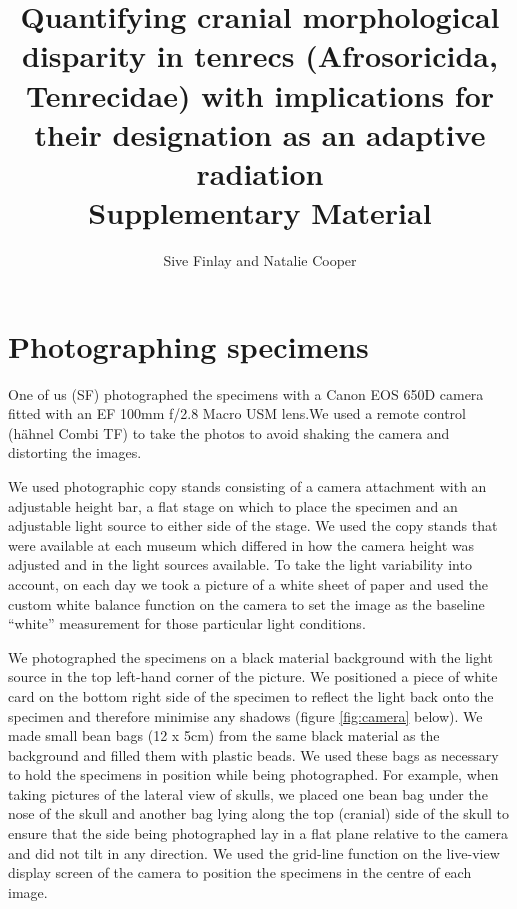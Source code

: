 \documentclass[12pt,a4paper]{article}
\begin{document}
\title{
       Quantifying cranial morphological disparity in tenrecs (Afrosoricida, Tenrecidae) with implications for their designation as an adaptive radiation\\
       \bigskip
       Supplementary Material }
\author{Sive Finlay and Natalie Cooper}
\date{}
\maketitle





\section{Photographing specimens}
One of us (SF) photographed the specimens with a Canon EOS 650D camera fitted with an EF 100mm f/2.8 Macro USM lens.We used a remote control (h\"ahnel Combi TF) to take the photos to avoid shaking the camera and distorting the images.

We used photographic copy stands consisting of a camera attachment with an adjustable height bar, a flat stage on which to place the specimen and an adjustable light source to either side of the stage. We used the copy stands that were available at each museum which differed in how the camera height was adjusted and in the light sources available.
To take the light variability into account, on each day we took a picture of a white sheet of paper and used the custom white balance function on the camera to set the image as the baseline “white” measurement for those particular light conditions.

We photographed the specimens on a black material background with the light source in the top left-hand corner of the picture. We positioned a piece of white card on the bottom right side of the specimen to reflect the light back onto the specimen and therefore minimise any shadows (figure \ref{fig:camera} below).
We made small bean bags (12 x 5cm) from the same black material as the background and filled them with plastic beads. We used these bags as necessary to hold the specimens in position while being photographed. For example, when taking pictures of the lateral view of skulls, we placed one bean bag under the nose of the skull and another bag lying along the top (cranial) side of the skull to ensure that the side being photographed lay in a flat plane relative to the camera and did not tilt in any direction. 
We used the grid-line function on the live-view display screen of the camera to position the specimens in the centre of each image. 
\end{document}
